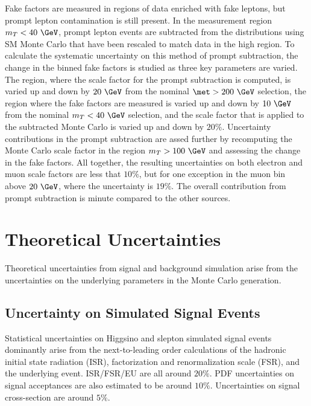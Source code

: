 Fake factors are measured in regions of data enriched with fake leptons, but prompt lepton contamination is still present.  In the measurement region $m_T<40~\GeV$, prompt lepton events are subtracted from the \pt distributions using SM Monte Carlo that have been rescaled to match data in the high \met region.  To calculate the systematic uncertainty on this method of prompt subtraction, the change in the binned fake factors is studied as three key parameters are varied.  The \met region, where the scale factor for the prompt subtraction is computed, is varied up and down by $20~\GeV$ from the nominal $\met>200~\GeV$ selection, the region where the fake factors are measured is varied up and down by $10~\GeV$ from the nominal $m_T<40~\GeV$ selection, and the scale factor that is applied to the subtracted Monte Carlo is varied up and down by $20\%$.  Uncertainty contributions in the prompt subtraction are assed further by recomputing the Monte Carlo scale factor in the region $m_T>100~\GeV$ and assessing the change in the fake factors.  All together, the resulting uncertainties on both electron and muon scale factors are less that $10\%$, but for one exception in the muon \pt bin above $20~\GeV$, where the uncertainty is $19\%$.  The overall contribution from prompt subtraction is minute compared to the other sources.

\section{Theoretical Uncertainties}
\label{sec:sys:thy}
Theoretical uncertainties from signal and background simulation arise from the uncertainties on the underlying parameters in the Monte Carlo generation.


\subsection{Uncertainty on Simulated Signal Events}
Statistical uncertainties on Higgsino and slepton simulated signal events dominantly arise from the next-to-leading order calculations of the hadronic initial state radiation (ISR), factorization and renormalization scale (FSR), and the underlying event.  ISR/FSR/EU are all around $20\%$.  PDF uncertainties on signal acceptances are also estimated to be around $10\%$.  Uncertainties on signal cross-section are around $5\%$.

